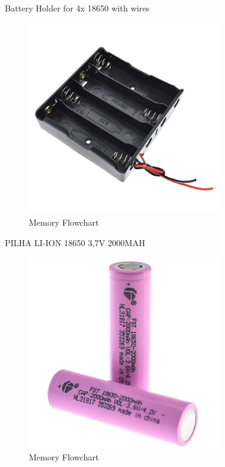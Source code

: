 Battery Holder for 4x 18650 with wires

\begin{figure}[H]
    \centering
    \includegraphics[width=0.75\textwidth]{images/chapter/design/components/battery-holder.jpg}  %
    \caption{Memory Flowchart}
    \label{fig:Memory Flowchart}        
\end{figure}

PILHA LI-ION 18650 3,7V 2000MAH

\begin{figure}[H]
    \centering
    \includegraphics[width=0.75\textwidth]{images/chapter/design/components/batt.jpg}  %
    \caption{Memory Flowchart}
    \label{fig:Memory Flowchart}        
\end{figure}

